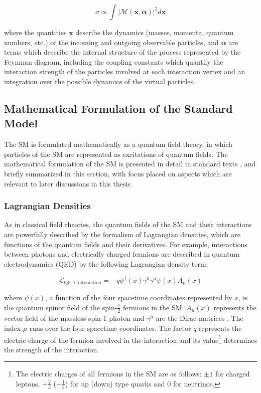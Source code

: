 \begin{equation}
\label{eq:matrix_element}
\sigma \propto \int|\mathcal{M(\boldsymbol{x}, \boldsymbol{\alpha})}|^2 d\boldsymbol{x} 
\end{equation}

\noindent where the quantities \(\boldsymbol{x}\) describe the dynamics (masses, momenta, quantum numbers, etc.) of the incoming and outgoing observable particles, and \(\boldsymbol{\alpha}\) are terms which describe the internal structure of the process represented by the Feynman diagram, including the coupling constants which quantify the interaction strength of the particles involved at each interaction vertex and an integration over the possible dynamics of the virtual particles. 

\subsection{Mathematical Formulation of the Standard Model}

The SM is formulated mathematically as a quantum field theory, in which particles of the SM are represented as excitations of quantum fields. The mathematical formulation of the SM is presented in detail in standard texts \cite{griffiths_2008, SM_intro}, and briefly summarized in this section, with focus placed on aspects which are relevant to later discussions in this thesis.

\subsubsection{Lagrangian Densities}

As in classical field theories, the quantum fields of the SM and their interactions are powerfully described by the formalism of Lagrangian densities, which are functions of the quantum fields and their derivatives. For example, interactions between photons and electrically charged fermions are described in quantum electrodynamics (QED) by the following Lagrangian density term:

\begin{equation}
\label{eq:qed_interaction}
\mathcal{L}_\text{QED, interaction} = -q\psi^\dagger(x)\gamma^0\gamma^\mu\psi(x) A_\mu(x)
\end{equation}

\noindent where \(\psi(x)\), a function of the four spacetime coordinates represented by \(x\), is the quantum spinor field of the spin-\(\frac{1}{2}\) fermions in the SM. \(A_\mu(x)\) represents the vector field of the massless spin-1 photon and \(\gamma^\mu\) are the Dirac matrices \cite{griffiths_2008}. The index \(\mu\) runs over the four spacetime coordinates. The factor \(q\) represents the electric charge of the fermion involved in the interaction and its value\footnote{The electric charges of all fermions in the SM are as follows: \(\pm1\) for charged leptons, \(+\frac{2}{3}\) (\(-\frac{1}{3}\)) for up (down) type quarks and 0 for neutrinos.} determines the strength of the interaction. 

